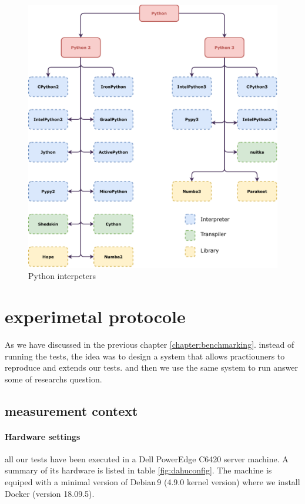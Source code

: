\begin{figure}
    \centering
    \includegraphics[width=\linewidth]{imgs/python-implementations-tree}
    \caption{Python interpeters}
    \label{fig:interpreters}
\end{figure}

\section{experimetal protocole}

As we have discussed in the previous chapter \ref{chapter:benchmarking}. instead of running the tests, the idea was to design a system that allows practiouners to reproduce and extends our tests. and then we use the same system to run answer some of researchs question.
\subsection{measurement context}
\paragraph{Hardware settings}

all our tests have been executed in a Dell PowerEdge C6420 server machine. A summary of its hardware is listed in table \ref{fig:dahuconfig}. The machine is equiped with a minimal version of Debian\,9 (4.9.0 kernel version) where we install Docker (version 18.09.5).



